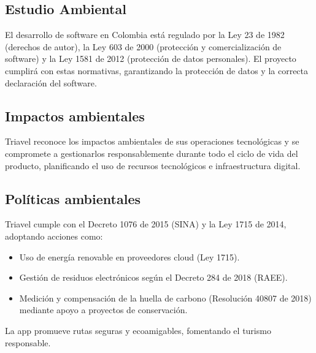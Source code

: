 \subsection{Estudio Ambiental}

El desarrollo de software en Colombia está regulado por la Ley 23 de 1982 (derechos de autor), la Ley 603 de 2000 (protección y comercialización de software) y la Ley 1581 de 2012 (protección de datos personales). El proyecto cumplirá con estas normativas, garantizando la protección de datos y la correcta declaración del software.

\subsection*{Impactos ambientales}

Triavel reconoce los impactos ambientales de sus operaciones tecnológicas y se compromete a gestionarlos responsablemente durante todo el ciclo de vida del producto, planificando el uso de recursos tecnológicos e infraestructura digital.

\subsection*{Políticas ambientales}

Triavel cumple con el Decreto 1076 de 2015 (SINA) y la Ley 1715 de 2014, adoptando acciones como:
\begin{itemize}
    \item Uso de energía renovable en proveedores cloud (Ley 1715).
    \item Gestión de residuos electrónicos según el Decreto 284 de 2018 (RAEE).
    \item Medición y compensación de la huella de carbono (Resolución 40807 de 2018) mediante apoyo a proyectos de conservación.
\end{itemize}
La app promueve rutas seguras y ecoamigables, fomentando el turismo responsable.
